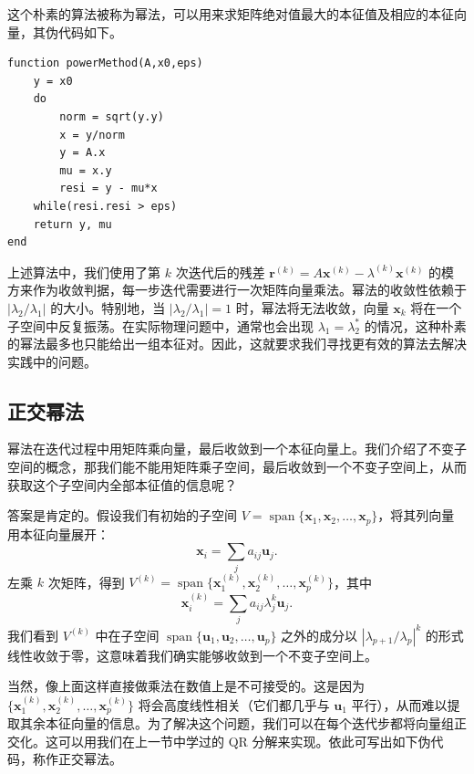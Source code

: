 这个朴素的算法被称为幂法，可以用来求矩阵绝对值最大的本征值及相应的本征向量，其伪代码如下。

\begin{algorithmBox}[算法 3.12\quad 幂法]
\begin{lstlisting}[style=bellacode]
function powerMethod(A,x0,eps)
    y = x0
    do
        norm = sqrt(y.y)
        x = y/norm
        y = A.x
        mu = x.y
        resi = y - mu*x
    while(resi.resi > eps)
    return y, mu
end
\end{lstlisting}
\end{algorithmBox}

上述算法中，我们使用了第 $k$ 次迭代后的残差 $\bm r^{(k)}=A\bm x^{(k)}-\lambda^{(k)}\bm x^{(k)}$ 的模方来作为收敛判据，每一步迭代需要进行一次矩阵向量乘法。幂法的收敛性依赖于 $|\lambda_2/\lambda_1|$ 的大小。特别地，当 $|\lambda_2/\lambda_1|=1$ 时，幂法将无法收敛，向量 $\bm x_k$ 将在一个子空间中反复振荡。在实际物理问题中，通常也会出现 $\lambda_1=\lambda_2^*$ 的情况，这种朴素的幂法最多也只能给出一组本征对。因此，这就要求我们寻找更有效的算法去解决实践中的问题。

\subsection{正交幂法}

幂法在迭代过程中用矩阵乘向量，最后收敛到一个本征向量上。我们介绍了不变子空间的概念，那我们能不能用矩阵乘子空间，最后收敛到一个不变子空间上，从而获取这个子空间内全部本征值的信息呢？

答案是肯定的。假设我们有初始的子空间 $V=\operatorname{span}\{\bm x_1,\bm x_2,\ldots,\bm x_p\}$，将其列向量用本征向量展开：
\begin{equation}
\bm x_i=\sum_j a_{ij}\bm u_j.
\tag{3.4.22}
\end{equation}
左乘 $k$ 次矩阵，得到 $V^{(k)}=\operatorname{span}\{\bm x_1^{(k)},\bm x_2^{(k)},\ldots,\bm x_p^{(k)}\}$，其中
\begin{equation}
\bm x_i^{(k)}=\sum_j a_{ij}\lambda_j^k\bm u_j.
\tag{3.4.23}
\end{equation}
我们看到 $V^{(k)}$ 中在子空间 $\operatorname{span}\{\bm u_1,\bm u_2,\ldots,\bm u_p\}$ 之外的成分以 $|\lambda_{p+1}/\lambda_p|^k$ 的形式线性收敛于零，这意味着我们确实能够收敛到一个不变子空间上。

当然，像上面这样直接做乘法在数值上是不可接受的。这是因为 $\{\bm x_1^{(k)},\bm x_2^{(k)},\ldots,\bm x_p^{(k)}\}$ 将会高度线性相关（它们都几乎与 $\bm u_1$ 平行），从而难以提取其余本征向量的信息。为了解决这个问题，我们可以在每个迭代步都将向量组正交化。这可以用我们在上一节中学过的 QR 分解来实现。依此可写出如下伪代码，称作正交幂法。

